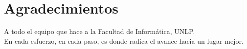 


\bigskip


\begingroup

\let\clearpage\relax
\let\cleardoublepage\relax
\let\cleardoublepage\relax

\chapter*{Agradecimientos} %

\begin{flushleft}
A todo el equipo que hace a la Facultad de Informática, UNLP.\\

\bigskip
En cada esfuerzo, en cada paso, es donde radica el avance hacia un lugar mejor.\\
\end{flushleft}





\endgroup